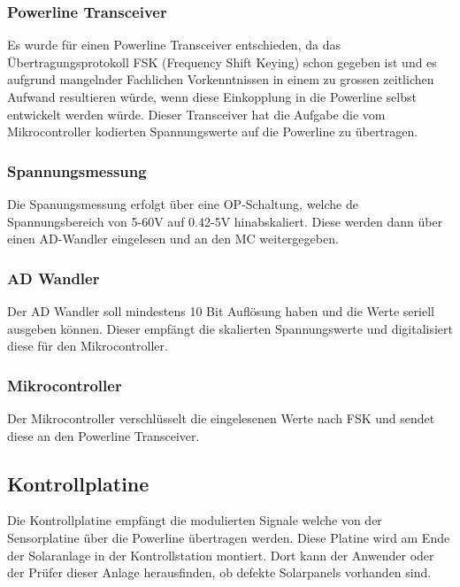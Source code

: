\newpage
\subsubsection{Powerline Transceiver}

Es wurde für einen Powerline Transceiver entschieden, da das Übertragungsprotokoll FSK (Frequency Shift Keying) schon gegeben ist und es aufgrund mangelnder Fachlichen Vorkenntnissen in einem zu grossen zeitlichen Aufwand resultieren würde, wenn diese Einkopplung in die Powerline selbst entwickelt werden würde. 
Dieser Transceiver hat die Aufgabe die vom Mikrocontroller kodierten Spannungswerte auf die Powerline zu übertragen.

\subsubsection{Spannungsmessung}

Die Spanungsmessung erfolgt über eine OP-Schaltung, welche de Spannungsbereich von 5-60V auf 0.42-5V hinabskaliert. Diese werden dann über einen AD-Wandler eingelesen und an den MC weitergegeben.

\subsubsection{AD Wandler}

Der AD Wandler soll mindestens 10 Bit Auflösung haben und die Werte seriell ausgeben können. Dieser empfängt die skalierten Spannungswerte und digitalisiert diese für den Mikrocontroller.

\subsubsection{Mikrocontroller}

Der Mikrocontroller verschlüsselt die eingelesenen Werte nach FSK und sendet diese an den Powerline Transceiver.

\subsection{Kontrollplatine}

Die Kontrollplatine empfängt die modulierten Signale welche von der Sensorplatine über die Powerline übertragen werden. Diese Platine wird am Ende der Solaranlage in der Kontrollstation montiert. Dort kann der Anwender oder der Prüfer dieser Anlage herausfinden, ob defekte Solarpanels vorhanden sind.

